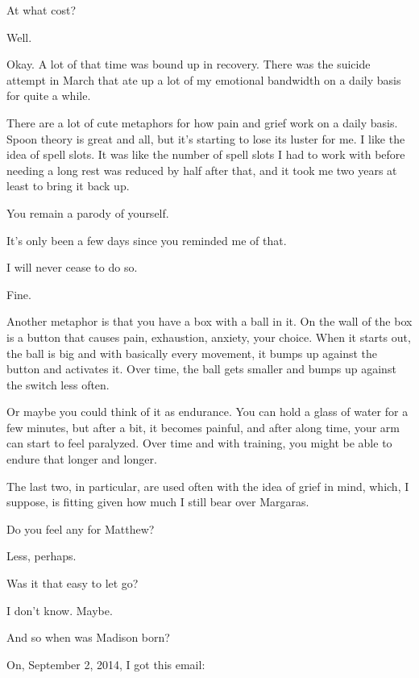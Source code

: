 \begin{ally}
At what cost?
\end{ally}
Well.

Okay. A lot of that time was bound up in recovery. There was the suicide attempt in March that ate up a lot of my emotional bandwidth on a daily basis for quite a while.

There are a lot of cute metaphors for how pain and grief work on a daily basis. Spoon theory is great and all, but it's starting to lose its luster for me. I like the idea of spell slots. It was like the number of spell slots I had to work with before needing a long rest was reduced by half after that, and it took me two years at least to bring it back up.

\begin{ally}
You remain a parody of yourself.
\end{ally}
It's only been a few days since you reminded me of that.

\begin{ally}
I will never cease to do so.
\end{ally}
Fine.

Another metaphor is that you have a box with a ball in it. On the wall of the box is a button that causes pain, exhaustion, anxiety, your choice. When it starts out, the ball is big and with basically every movement, it bumps up against the button and activates it. Over time, the ball gets smaller and bumps up against the switch less often.

Or maybe you could think of it as endurance. You can hold a glass of water for a few minutes, but after a bit, it becomes painful, and after along time, your arm can start to feel paralyzed. Over time and with training, you might be able to endure that longer and longer.

The last two, in particular, are used often with the idea of grief in mind, which, I suppose, is fitting given how much I still bear over Margaras.

\begin{ally}
Do you feel any for Matthew?
\end{ally}
Less, perhaps.

\begin{ally}
Was it that easy to let go?
\end{ally}
I don't know. Maybe.
\newpage

\begin{ally}
And so when was Madison born?
\end{ally}
On, September 2, 2014, I got this email:


